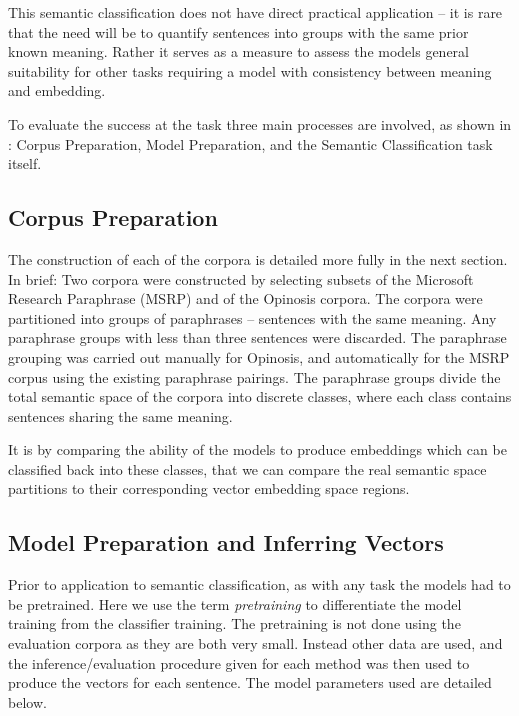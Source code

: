 \documentclass[]{book}
\begin{document}
This semantic classification does not have direct practical application
-- it is rare that the need will be to quantify sentences into groups
with the same prior known meaning. Rather it serves as a measure to
assess the models general suitability for other tasks requiring a
model with consistency between meaning and embedding.

To evaluate the success at the task three main processes are involved,
as shown in : Corpus Preparation, Model Preparation,
and the Semantic Classification task itself.


\subsection{Corpus Preparation}

The construction of each of the corpora is detailed more fully in
the next section. In brief: Two corpora were constructed by selecting
subsets of the Microsoft Research Paraphrase (MSRP) \cite{msrParapharaCorpus}
and of the Opinosis \cite{ganesan2010opinosis} corpora. The corpora
were partitioned into groups of paraphrases -- sentences with the
same meaning. Any paraphrase groups with less than three sentences
were discarded. The paraphrase grouping was carried out manually for
Opinosis, and automatically for the MSRP corpus using the existing
paraphrase pairings. The paraphrase groups divide the total semantic
space of the corpora into discrete classes, where each class contains
sentences sharing the same meaning.

It is by comparing the ability of the models to produce embeddings
which can be classified back into these classes, that we can compare
the real semantic space partitions to their corresponding vector embedding
space regions.


\subsection{Model Preparation and Inferring Vectors}

Prior to application to semantic classification, as with any task
the models had to be pretrained. Here we use the term \emph{pretraining}
to differentiate the model training from the classifier training.
The pretraining is not done using the evaluation corpora as they are
both very small. Instead other data are used, and the inference/evaluation
procedure given for each method was then used to produce the vectors
for each sentence. The model parameters used are detailed below.
\end{document}
